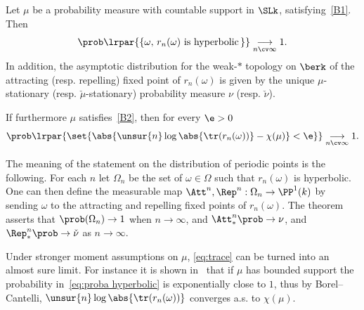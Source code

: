 \begin{theo}\label{thm:loxodromic}
Let $\mu$ be a probability measure with countable support in $\SLk$, satisfying~\eqref{B1}. Then
\begin{equation}\label{eq:proba hyperbolic}
\prob\lrpar{\left\{ \omega, \, r_n(\omega)
\text{ is hyperbolic}\, \right\}}
\underset {n\cv\infty}\longrightarrow 1.
\end{equation}
In addition, the asymptotic distribution for the weak-$\ast$ topology on $\berk$ of the attracting (resp. repelling) fixed point of $r_n(\omega)$ is given by the unique $\mu$-stationary (resp. $\check{\mu}$-stationary) probability measure $\nu$ (resp. $\check{\nu}$).

If furthermore $\mu$ satisfies~\eqref{B2}, then for every $\e>0$
\begin{equation}\label{eq:trace}
\prob\lrpar{\set{
\abs{ \unsur{n}\log\abs{\tr (r_n(\omega))} - \chi(\mu)} <\e }} \underset {n\cv\infty}\longrightarrow 1.
\end{equation}
\end{theo}

\begin{rema}\label{rem:301}
The meaning of the statement on the distribution of periodic points is the following. For each $n$ let $\Omega_n$ be the set of $\omega\in \Omega$ such that $r_n(\omega)$ is hyperbolic. One can then define the measurable map $\Att^n, \Rep^n: \Omega_n \to \PP^1(k)$ by sending $\omega$ to the attracting and repelling fixed points of $r_n(\omega)$. The theorem asserts that $\prob(\Omega_n) \to1$ when $n\to\infty$, and $\Att^n_* \prob \to \nu$, and $\Rep^n_* \prob \to \check{\nu}$ as $n\to\infty$.
\end{rema}

\begin{rema}\label{rem:302}
Under stronger moment assumptions on $\mu$, \eqref{eq:trace} can be turned
into an almost sure limit. For instance it is shown in~\cite[Thm.~1.4]{maher-tiozzo} that if $\mu$ has bounded support the probability in~\eqref{eq:proba hyperbolic} is exponentially close to $1$, thus by Borel--Cantelli, $\unsur{n}\log\abs{\tr (r_n(\omega))}$ converges a.s. to $\chi(\mu)$.
\end{rema}


